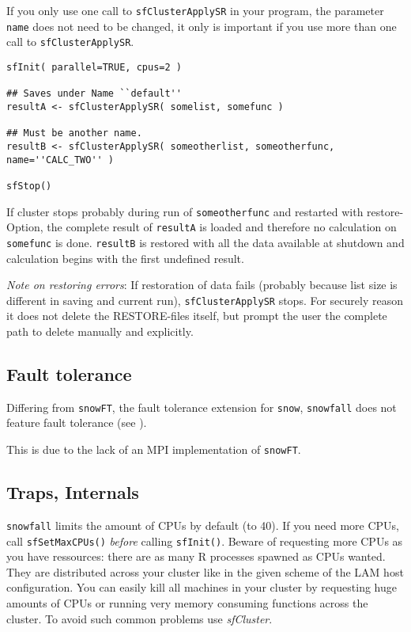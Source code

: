 \documentclass[10pt,oneside]{article}
\begin{document}
If you only use one call to \texttt{sfClusterApplySR} in your program,
the parameter \texttt{name} does not need to be changed, it only is
important if you use more than one call to \texttt{sfClusterApplySR}.

\begin{verbatim}
sfInit( parallel=TRUE, cpus=2 )

## Saves under Name ``default''
resultA <- sfClusterApplySR( somelist, somefunc )

## Must be another name.
resultB <- sfClusterApplySR( someotherlist, someotherfunc, name=''CALC_TWO'' )

sfStop()
\end{verbatim}

If cluster stops probably during run of \texttt{someotherfunc} and
restarted with restore-Option, the complete result of \texttt{resultA}
is loaded and therefore no calculation on \texttt{somefunc} is done.
\texttt{resultB} is restored with all the data available at shutdown
and calculation begins with the first undefined result.

\emph{Note on restoring errors}: If restoration of data fails (probably
because list size is different in saving and current run),
\texttt{sfClusterApplySR} stops. For securely reason it does not delete
the RESTORE-files itself, but prompt the user the complete path to
delete manually and explicitly.

\subsection{Fault tolerance}
Differing from \texttt{snowFT}, the fault tolerance extension for
\texttt{snow}, \texttt{snowfall} does not feature fault tolerance
(see \cite{HANA_04}).

This is due to the lack of an MPI implementation of \texttt{snowFT}.

\subsection{Traps, Internals}
\texttt{snowfall} limits the amount of CPUs by default (to 40). If you
need more CPUs, call \texttt{sfSetMaxCPUs()} \emph{before} calling \texttt{sfInit()}.
Beware of requesting more CPUs as you have ressources: there are as many R processes
spawned as CPUs wanted. They are distributed across your cluster like in the
given scheme of the LAM host configuration. You can easily kill all machines in
your cluster by requesting huge amounts of CPUs or running very memory consuming
functions across the cluster. To avoid such common problems use \emph{sfCluster}.
\end{document}
